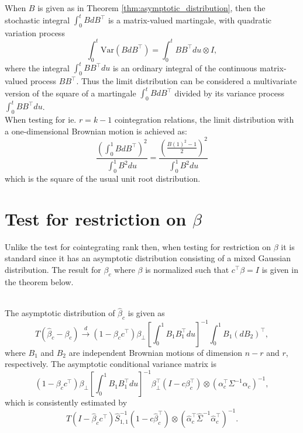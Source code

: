 \noindent When $B$ is given as in Theorem \ref{thm:asymptotic_distribution}, then the stochastic integral $\int_0^t BdB^\top$ is a matrix-valued martingale, with quadratic variation process
\begin{equation*}
    \int_0^t \text{Var}(BdB^\top) =\int_0^t BB^\top du \otimes I,
\end{equation*}
\noindent where the integral $\int_0^t BB^\top du$ is an ordinary integral of the continuous matrix-valued process $BB^\top$. Thus the limit distribution can be considered a multivariate version of the square of a martingale $\int_0^t BdB^\top$ divided by its variance process $\int_0^t BB^\top du$.\\
When testing for ie. $r=k-1$ cointegration relations, the limit distribution with a one-dimensional Brownian motion is achieved as:
\begin{equation*}
   \frac{\left(\int_0^1 BdB^\top \right)^2}{\int_0^1 B^2du}=\frac{\left(\frac{B(1)^2-1}{2} \right)^2}{\int_0^1 B^2du}
\end{equation*}
which is the square of the usual unit root distribution.
\section{Test for restriction on $\beta$}
Unlike the test for cointegrating rank then, when testing for restriction on $\beta$ it is standard since it has an asymptotic distribution consisting of a mixed Gaussian distribution. The result for $\beta_c$ where $\beta$ is normalized such that $c^\top \beta=I$ is given in the theorem below.
\begin{thm}\phantom\\
The asymptotic distribution of $\hat{\beta}_c$ is given as 
\begin{equation}
    T(\hat{\beta}
_c-\beta_c) \overset{d}{\rightarrow} (1-\beta_c c^\top) \beta_\perp \left[ \int_0^1 B_1 B_1^\top du \right]^{-1} \int_0^1 B_1(dB_2)^\top,
    \label{eq:asymptotic_Beta_1}
\end{equation}
    where $B_1$ and $B_2$ are independent Brownian motions of dimension $n-r$ and $r$, respectively. The asymptotic conditional variance matrix is 
    \begin{equation}
        (1-\beta_c c^\top) \beta_\perp \left[\int_0^1 B_1B_1^\top du \right]^{-1} \beta_\perp^\top (I-c\beta_c^\top ) \otimes (\alpha_c^\top \Sigma^{-1}\alpha_c)^{-1},
        \label{eq:asymptotic_Beta_2}
    \end{equation}
    which is consistently estimated by
    \begin{equation}
        T(I-\hat{\beta}_c c^\top)\hat{S}_{1,1}^{-1}(1-c\hat{\beta}_c^\top) \otimes (\hat{\alpha}_c^\top \hat{\Sigma}^{-1}\hat{\alpha}_c^\top)^{-1}.
        \label{eq:asymptotic_Beta_3}
    \end{equation}
\end{thm}

